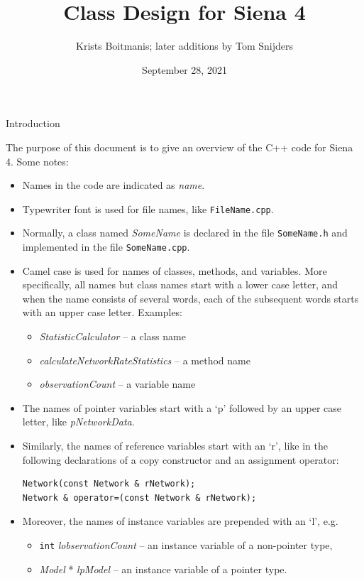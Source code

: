 \documentclass[12pt]{article}
\makeatletter
\renewcommand{\=}{\,=\,}
\newcommand{\+}{\,+\,}
\newcommand{\nnm}[1]{\textsf{\small\textit{#1}}}
\renewcommand{\section}{\@startsection{section}{1}
                {0pt}{\baselineskip}{0.5\baselineskip}
                {\centering\sffamily} }
\makeatother
\begin{document}
\title{Class Design for Siena 4}
\author{Krists Boitmanis; later additions by Tom Snijders}
\date{September 28, 2021}
\maketitle

\section{Introduction}

The purpose of this document is to give an overview of the C++ code for Siena 4.
Some notes:
\begin{itemize}
\item Names in the code are indicated as \nnm{name}.
\item Typewriter font is used for file names, like \texttt{FileName.cpp}.
\item Normally, a class named \nnm{SomeName} is declared in
the file \texttt{SomeName.h} and implemented in the file \texttt{SomeName.cpp}.
\item Camel case is used for names of classes, methods, and variables. More
specifically, all names but class names start with a lower case letter, and
when the name consists of several words, each of the subsequent words starts
with an upper case letter. Examples:
	\begin{itemize}
	\item \nnm{StatisticCalculator} -- a class name
	\item \nnm{calculateNetworkRateStatistics} -- a method name
	\item \nnm{observationCount} -- a variable name
	\end{itemize}
\item The names of pointer variables start with a `p' followed by an upper case
letter, like \nnm{pNetworkData}.
\item Similarly, the names of reference variables start with an `r', like in the
following declarations of a copy constructor and an assignment operator:
\begin{verbatim}
Network(const Network & rNetwork);
Network & operator=(const Network & rNetwork);
\end{verbatim}
\item Moreover, the names of instance variables are prepended with an `l', e.g.
	\begin{itemize}
	\item \verb|int| \nnm{lobservationCount} -- an instance variable of a
non-pointer type,
	\item \nnm{Model} * \nnm{lpModel} -- an instance variable of a pointer
type.
	\end{itemize}
\end{itemize}
\end{document}
